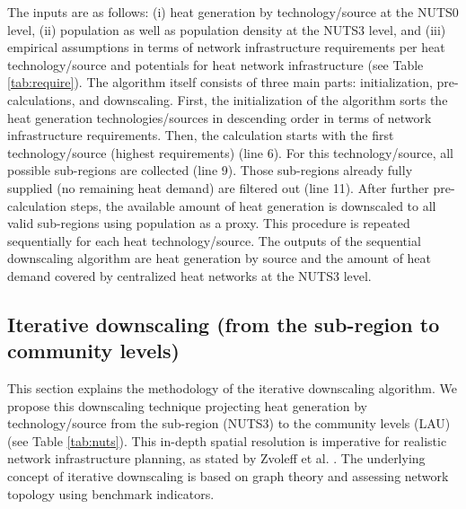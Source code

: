 The inputs are as follows: (i) heat generation by technology/source at the NUTS0 level, (ii) population as well as population density at the NUTS3 level, and (iii) empirical assumptions in terms of network infrastructure requirements per heat technology/source and potentials for heat network infrastructure (see Table \ref{tab:require}). The algorithm itself consists of three main parts: initialization, pre-calculations, and downscaling. First, the initialization of the algorithm sorts the heat generation technologies/sources in descending order in terms of network infrastructure requirements. Then, the calculation starts with the first technology/source (highest requirements) (line 6). For this technology/source, all possible sub-regions are collected (line 9). Those sub-regions already fully supplied (no remaining heat demand) are filtered out (line 11). After further pre-calculation steps, the available amount of heat generation is downscaled to all valid sub-regions using population as a proxy. This procedure is repeated sequentially for each heat technology/source. The outputs of the sequential downscaling algorithm are heat generation by source and the amount of heat demand covered by centralized heat networks at the NUTS3 level.

\subsection{Iterative downscaling (from the sub-region to community levels)}\label{alg2}
This section explains the methodology of the iterative downscaling algorithm. We propose this downscaling technique projecting heat generation by technology/source from the sub-region (NUTS3) to the community levels (LAU) (see Table \ref{tab:nuts}). This in-depth spatial resolution is imperative for realistic network infrastructure planning, as stated by Zvoleff et al. \cite{zvoleff2009impact}. The underlying concept of iterative downscaling is based on graph theory and assessing network topology using benchmark indicators. 

